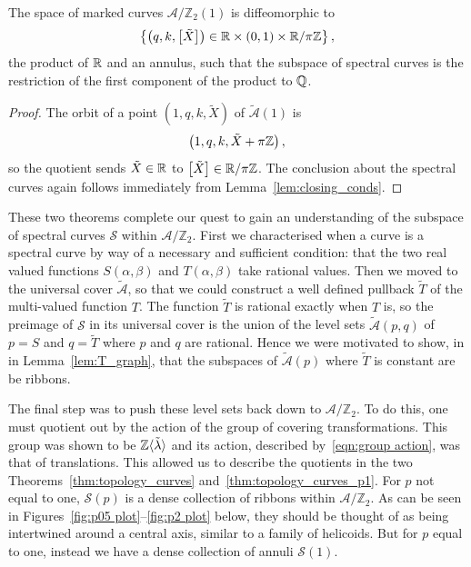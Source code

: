 \documentclass{article}
\begin{document}
\begin{thm}
\label{thm:topology_curves_p1}
The space of marked curves $\mathcal{A}/\mathbb{Z}_2(1)$ is diffeomorphic to
\[
\left\{ \left(q,k,\left[\tilde{X}\right]\right) \in \mathbb{R} \times (0,1) \times \mathbb{R}/\pi\mathbb{Z} \right\},
\]
the product of $\mathbb{R}$ and an annulus, such that the subspace of spectral curves is the restriction of the first component of the product to $\mathbb{Q}$.

\begin{proof}
The orbit of a point $(1,q,k,\tilde{X})$ of $\mathcal{\tilde{A}}(1)$ is
\[
\left(1,q,k,\tilde{X}+\pi\mathbb{Z}\right),
\]
so the quotient sends $\tilde{X} \in \mathbb{R}$ to $\left[\tilde{X}\right] \in \mathbb{R}/\pi\mathbb{Z}$. The conclusion about the spectral curves again follows immediately from Lemma~\ref{lem:closing_conds}.
\end{proof}
\end{thm}

These two theorems complete our quest to gain an understanding of the subspace of spectral curves $\mathcal{S}$ within $\mathcal{A}/\mathbb{Z}_2$. First we characterised when a curve is a spectral curve by way of a necessary and sufficient condition: that the two real valued functions $S(\alpha,\beta)$ and $T(\alpha,\beta)$ take rational values.
Then we moved to the universal cover $\mathcal{\tilde{A}}$, so that we could construct a well defined pullback $\tilde{T}$ of the multi-valued function $T$. The function $\tilde{T}$ is rational exactly when $T$ is, so the preimage of $\mathcal{S}$ in its universal cover is the union of the level sets $\mathcal{\tilde{A}}(p,q)$ of $p = S$ and $q = \tilde{T}$ where $p$ and $q$ are rational. Hence we were motivated to show, in in Lemma~\ref{lem:T_graph}, that the subspaces of $\mathcal{\tilde{A}}(p)$ where $\tilde{T}$ is constant are be ribbons.

The final step was to push these level sets back down to $\mathcal{A}/\mathbb{Z}_2$. To do this, one must quotient out by the action of the group of covering transformations. This group was shown to be $\mathbb{Z}\langle\tilde{\lambda}\rangle$ and its action, described by~\eqref{eqn:group action}, was that of translations. This allowed us to describe the quotients in the two Theorems~\ref{thm:topology_curves} and~\ref{thm:topology_curves_p1}. For $p$ not equal to one, $\mathcal{S}(p)$ is a dense collection of ribbons within $\mathcal{A}/\mathbb{Z}_2$. As can be seen in Figures~\ref{fig:p05 plot}--\ref{fig:p2 plot} below, they should be thought of as being intertwined around a central axis, similar to a family of helicoids. But for $p$ equal to one, instead we have a dense collection of annuli $\mathcal{S}(1)$.
\end{document}
